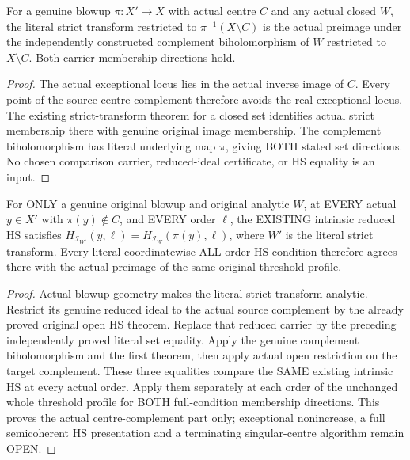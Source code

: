 \begin{lemma}
\label{hir:actual-blowup-centre-complement-strict-carrier-dictionary}
\leanok
For a genuine blowup $\pi:X'\to X$ with actual centre $C$ and any actual
closed $W$, the literal strict transform restricted to
$\pi^{-1}(X\setminus C)$ is the actual preimage under the independently
constructed complement biholomorphism of $W$ restricted to $X\setminus C$.
Both carrier membership directions hold.
\end{lemma}
\begin{proof}
The actual exceptional locus lies in the actual inverse image of $C$.
Every point of the source centre complement therefore avoids the real
exceptional locus. The existing strict-transform theorem for a closed
set identifies actual strict membership there with genuine original
image membership. The complement biholomorphism has literal underlying
map $\pi$, giving BOTH stated set directions. No chosen comparison
carrier, reduced-ideal certificate, or HS equality is an input.
\end{proof}

\begin{theorem}
\label{hir:actual-blowup-off-centre-intrinsic-reduced-hs}
\leanok
For ONLY a genuine original blowup and original analytic $W$, at EVERY
actual $y\in X'$ with $\pi(y)\notin C$, and EVERY order $\ell$, the EXISTING
intrinsic reduced HS satisfies $H_{\mathcal I_{W'}}(y,\ell)=
H_{\mathcal I_W}(\pi(y),\ell)$, where $W'$ is the literal strict transform.
Every literal coordinatewise ALL-order HS condition therefore agrees there
with the actual preimage of the same original threshold profile.
\end{theorem}
\begin{proof}
Actual blowup geometry makes the literal strict transform analytic.
Restrict its genuine reduced ideal to the actual source complement by
the already proved original open HS theorem. Replace that reduced
carrier by the preceding independently proved literal set equality.
Apply the genuine complement biholomorphism and the first theorem,
then apply actual open restriction on the target complement. These three
equalities compare the SAME existing intrinsic HS at every actual order.
Apply them separately at each order of the unchanged whole threshold
profile for BOTH full-condition membership directions. This proves the
actual centre-complement part only; exceptional nonincrease, a full
semicoherent HS presentation and a terminating singular-centre algorithm
remain OPEN.
\end{proof}
